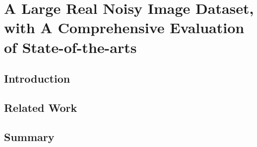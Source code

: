 %
\chapter{A Large Real Noisy Image Dataset, with A Comprehensive Evaluation of State-of-the-arts}
\label{sec:real}


\blindtext

\section{Introduction}
\label{sec:real:intro}

\blindtext

\section{Related Work}
\label{sec:real:related}

\blindtext


\section{Summary}
\label{sec:real:summary}

\blindtext
